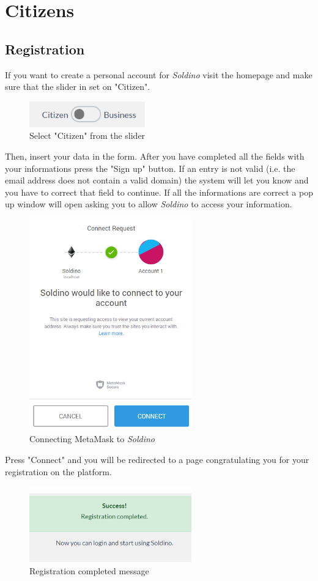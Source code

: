 \section{Citizens}
	\subsection{Registration}
	If you want to create a personal account for \textit{Soldino} visit the
	homepage and make sure that the slider in set on "Citizen".\\
	\begin{figure}[H]
		\includegraphics[width=5cm]{res/images/user_citizen.png}
		\centering
		\caption{Select "Citizen" from the slider}
	\end{figure}	
	\noindent Then, insert your data in the form. After you have completed all the
	fields with your informations press the "Sign up" button. If an entry 
	is not valid (i.e. the email address does not contain a valid domain) 
	the system will let you know and you have to correct that field to continue.
	If all the informations are correct a pop up window will open asking you 
	to allow \textit{Soldino} to access your information.\\
	\begin{figure}[H]
		\includegraphics[width=7cm]{res/images/metamask_connect.png}
		\centering
		\caption{Connecting MetaMask to \textit{Soldino}}
	\end{figure}
	\noindent Press "Connect" and you will be redirected to a page 
	congratulating you for your registration on the platform.
	\begin{figure}[H]
		\includegraphics[width=7cm]{res/images/registration_complete.png}
		\centering
		\caption{Registration completed message}
	\end{figure}
